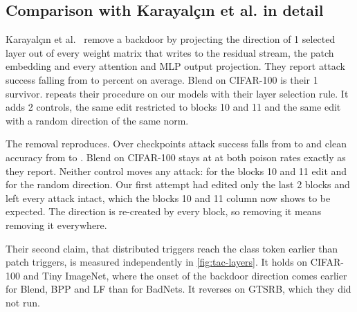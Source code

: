 \subsection{Comparison with Karayal\c{c}{\i}n et al. in detail}
\label{app:picek}

Karayal\c{c}{\i}n et al.~\cite{karayalcin2026backdoor} remove a backdoor by projecting the direction of 1 selected layer out of every weight matrix that writes to the residual stream, the patch embedding and every attention and MLP output projection. They report attack success falling from  to  percent on average. Blend on CIFAR-100 is their 1 survivor.  repeats their procedure on our models with their layer selection rule. It adds 2 controls, the same edit restricted to blocks 10 and 11 and the same edit with a random direction of the same norm.

\FloatBarrier

The removal reproduces. Over \ErasureCheckpoints{} checkpoints attack success falls from \ErasureAsrBeforeMean{} to \ErasureAsrAfterAllWritesMean{} and clean accuracy from \ErasureCaBeforeMean{} to \ErasureCaAfterAllWritesMean{}. Blend on CIFAR-100 stays at \ErasureAsrAfterAllWritesMax{} at both poison rates exactly as they report. Neither control moves any attack: \ErasureAsrAfterBlocksOneZeroOneOneMean{} for the blocks 10 and 11 edit and \ErasureAsrAfterRandomDirectionMean{} for the random direction. Our first attempt had edited only the last 2 blocks and left every attack intact, which the blocks 10 and 11 column now shows to be expected. The direction is re-created by every block, so removing it means removing it everywhere.

Their second claim, that distributed triggers reach the class token earlier than patch triggers, is measured independently in \cref{fig:tac-layers}. It holds on CIFAR-100 and Tiny ImageNet, where the onset of the backdoor direction comes earlier for Blend, BPP and LF than for BadNets. It reverses on GTSRB, which they did not run.

